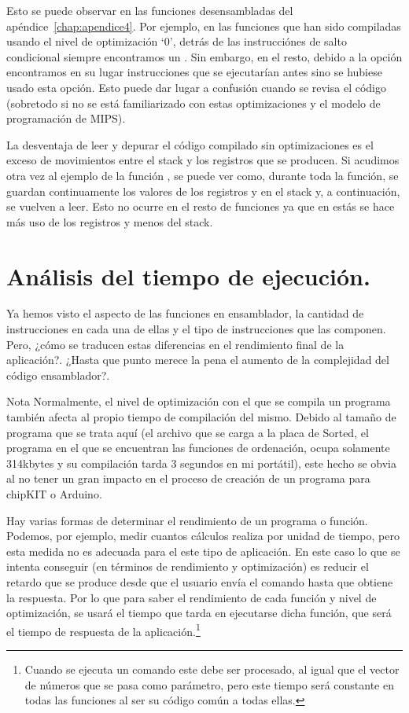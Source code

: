 Esto se puede observar en las funciones desensambladas del apéndice~\ref{chap:apendice4}. Por ejemplo, en las funciones que han sido compiladas usando el nivel de optimización `0', detrás de las instrucciónes de salto condicional siempre encontramos un . Sin embargo, en el resto, debido a la opción  encontramos en su lugar instrucciones que se ejecutarían antes sino se hubiese usado esta opción. Esto puede dar lugar a confusión cuando se revisa el código (sobretodo si no se está familiarizado con estas optimizaciones y el modelo de programación de MIPS).

La desventaja de leer y depurar el código compilado sin optimizaciones es el exceso de movimientos entre el stack y los registros que se producen. Si acudimos otra vez al ejemplo de la función , se puede ver como, durante toda la función, se guardan continuamente los valores de los registros  y  en el stack y, a continuación, se vuelven a leer. Esto no ocurre en el resto de funciones ya que en estás se hace más uso de los registros y menos del stack.

\section{Análisis del tiempo de ejecución.} %
\label{sec:Análisis del tiempo de ejecución.}
Ya hemos visto el aspecto de las funciones en ensamblador, la cantidad de instrucciones en cada una de ellas y el tipo de instrucciones que las componen. Pero, ¿cómo se traducen estas diferencias en el rendimiento final de la aplicación?. ¿Hasta que punto merece la pena el aumento de la complejidad del código ensamblador?.

\begin{mymdframed}{Nota}
	Normalmente, el nivel de optimización con el que se compila un programa también afecta al propio tiempo de compilación del mismo. Debido al tamaño de programa que se trata aquí (el archivo que se carga a la placa de Sorted, el programa en el que se encuentran las funciones de ordenación, ocupa solamente 314kbytes y su compilación tarda 3 segundos en mi portátil), este hecho se obvia al no tener un gran impacto en el proceso de creación de un programa para chipKIT o Arduino.
\end{mymdframed}

Hay varias formas de determinar el rendimiento de un programa o función. Podemos, por ejemplo, medir cuantos cálculos realiza por unidad de tiempo, pero esta medida no es adecuada para el este tipo de aplicación. En este caso lo que se intenta conseguir (en términos de rendimiento y optimización) es reducir el retardo que se produce desde que el usuario envía el comando hasta que obtiene la respuesta. Por lo que para saber el rendimiento de cada función y nivel de optimización, se usará el tiempo que tarda en ejecutarse dicha función, que será el tiempo de respuesta de la aplicación.\footnote{Cuando se ejecuta un comando este debe ser procesado, al igual que el vector de números que se pasa como parámetro, pero este tiempo será constante en todas las funciones al ser su código común a todas ellas.}

